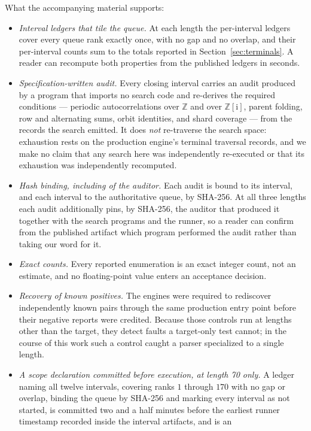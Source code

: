 \documentclass[11pt]{article}
\newcommand{\ii}{\mathrm{i}}
\begin{document}
What the accompanying material supports:
\begin{itemize}
  \item \emph{Interval ledgers that tile the queue.} At each length the
  per-interval ledgers cover every queue rank exactly once, with no gap and no
  overlap, and their per-interval counts sum to the totals reported in
  Section~\ref{sec:terminals}.  A reader can recompute both properties from the
  published ledgers in seconds.
  \item \emph{Specification-written audit.} Every closing interval carries an
  audit
  produced by a program that imports no search code and re-derives the required
  conditions --- periodic autocorrelations over $\mathbb{Z}$ and over
  $\mathbb{Z}[\ii]$, parent folding, row and alternating sums, orbit
  identities, and shard coverage --- from the records the search emitted.  It
  does \emph{not} re-traverse the search space: exhaustion rests on the
  production engine's terminal traversal records, and we make no claim that any
  search here was independently re-executed or that its exhaustion was
  independently recomputed.
  \item \emph{Hash binding, including of the auditor.} Each audit is bound to
  its interval, and each interval to the authoritative queue, by SHA-256.  At
  all three lengths each audit additionally pins, by SHA-256, the auditor that
  produced it together with the search programs and the runner, so a reader can
  confirm from the published artifact which program performed the audit rather
  than taking our word for it.
  \item \emph{Exact counts.} Every reported enumeration is an exact integer
  count, not an estimate, and no floating-point value enters an acceptance
  decision.
  \item \emph{Recovery of known positives.} The engines were required to
  rediscover independently known pairs through the same production entry point
  before their negative reports were credited.  Because those controls run at
  lengths other than the target, they detect faults a target-only test cannot;
  in the course of this work such a control caught a parser specialized to a
  single length.
  \item \emph{A scope declaration committed before execution, at length 70
  only.} A ledger naming all twelve intervals, covering ranks $1$ through
  $170$ with no gap or overlap, binding the queue by SHA-256 and marking every
  interval as not started, is committed two and a half minutes before the
  earliest runner timestamp recorded inside the interval artifacts, and is an

\end{itemize}
\end{document}
